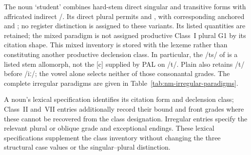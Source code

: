 The noun  `student' combines hard-stem direct singular and transitive
forms with affricated indirect /. Its direct
plural permits  and , with corresponding
anchored  and ; no register distinction is
assigned to these variants. Its listed quantities are retained; the mixed
paradigm is not assigned productive Class~I plural G1 by its citation shape.
This mixed inventory is stored with the lexeme
rather than constituting another productive declension class. In particular,
the /ts/ of  is a listed stem allomorph, not the [c] supplied
by PAL on /t/. Plain  also retains /t/ before /iː/;
the vowel alone selects neither of those consonantal grades. The complete
irregular paradigms are given in Table~\ref{tab:nm-irregular-paradigms}.

A noun's lexical specification identifies its citation form and declension class;
Class~II and~VII entries additionally record their bound and front grades
where these cannot be recovered from the class designation. Irregular entries
specify the relevant plural or oblique grade and exceptional endings. These
lexical specifications supplement the class inventory without changing the
three structural case values or the singular--plural distinction.

